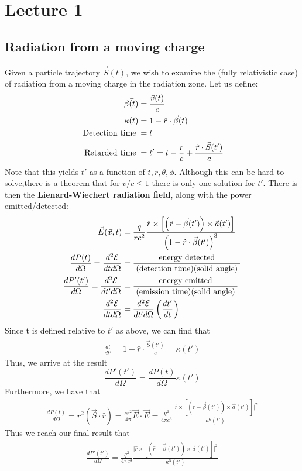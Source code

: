 \section{Lecture 1}

\subsection{Radiation from a moving charge}

Given a particle trajectory $\vec{S}(t)$, we wish to examine the (fully relativistic case) of radiation from a moving charge in the radiation zone. Let us define:
\begin{align*}
    \vec{\beta(t)}&=\frac{\vec{v}(t)}{c}\\
    \kappa(t)&=1-\hat{r}\cdot \vec{\beta}(t)\\
    \;\textnormal{Detection time}\;&=t\\
    \;\textnormal{Retarded time}\; &= t'=t-\frac{r}{c}+\frac{\hat{r}\cdot\vec{S}(t')}{c}\\
\end{align*}
Note that this yields $t'$ as a function of $t, r, \theta, \phi$. Although this can be hard to solve,there is a theorem that for $v/c\leq1$ there is only one solution
for $t'$. There is then the \textbf{Lienard-Wiechert radiation field}, along with the power emitted/detected:
\begin{align*}
    \vec{E}(\vec{x}, t)&=\frac{q}{r c^2}\frac{\hat{r}\times\left[ \left( \hat{r}-\vec{\beta}(t') \right)\times \vec{a}(t') \right]}{\left( 1-\hat{r}\cdot\vec{\beta}(t') \right)^3}\\
    \frac{dP(t)}{d\Omega}=\frac{d^2\mathcal{E}}{dt d\Omega}&=\frac{\;\textnormal{energy detected}\;}{\;\textnormal{(detection time)(solid angle)}\;}\\
    \frac{dP'(t')}{d\Omega}=\frac{d^2\mathcal{E}}{dt' d\Omega}&=\frac{\;\textnormal{energy emitted}\;}{\;\textnormal{(emission time)(solid angle)}\;}\\
    \frac{d^2\mathcal{E}}{dt d\Omega}&=\frac{d^2\mathcal{E}}{dt'd\Omega}\left( \frac{dt'}{dt} \right)
\end{align*}
Since t is defined relative to $t'$ as above, we can find that
\begin{align*}
    \frac{dt}{dt'}=1-\hat{r}\cdot\frac{\dot{\vec{S}}(t')}{c}=\kappa(t')
\end{align*}
Thus, we arrive at the result
\begin{equation*}
    \frac{dP'(t')}{d\Omega}=\frac{dP(t)}{d\Omega}\kappa(t')
\end{equation*}
Furthermore, we have that
\begin{align*}
    \frac{dP(t)}{d\Omega}=r^2(\vec{S}\cdot\hat{r})=\frac{cr^2}{4\pi}\vec{E}\cdot\vec{E}=\frac{q^2}{4\pi c^3}\frac{\big|\hat{r}\times\left[ (\hat{r}-\vec{\beta}(t'))\times\vec{a}(t') \right]\big|^2}{\kappa^6(t')}
\end{align*}
Thus we reach our final result that
\begin{align*}
    \frac{dP'(t')}{d\Omega}=\frac{q^2}{4\pi c^3}\frac{\big|\hat{r}\times\left[ (\hat{r}-\vec{\beta}(t'))\times\vec{a}(t') \right]\big|^2}{\kappa^5(t')}
\end{align*}

